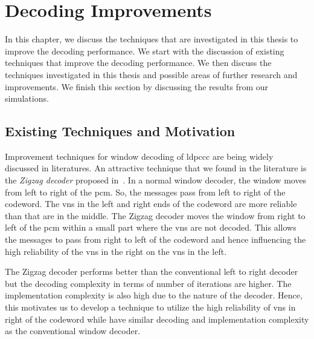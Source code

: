 \chapter{Decoding Improvements}\label{ch:dec_improve}
In this chapter, we discuss the techniques that are investigated in this thesis to improve the decoding performance. We start with the discussion of existing techniques that improve the decoding performance. We then discuss the techniques investigated in this thesis and possible areas of further research and improvements. We finish this section by discussing the results from our simulations.

\section{Existing Techniques and Motivation}
Improvement techniques for window decoding of \gls{ldpccc} are being widely discussed in literatures. An attractive technique that we found in the literature is the \emph{Zigzag decoder} proposed in~\cite{Shadi2015}. In a normal window decoder, the window moves from left to right of the \gls{pcm}. So, the messages pass from left to right of the codeword. The \glspl{vn} in the left and right ends of the codeword are more reliable than that are in the middle. The Zigzag decoder moves the window from right to left of the \gls{pcm} within a small part where the \glspl{vn} are not decoded. This allows the messages to pass from right to left of the codeword and hence influencing the high reliability of the \glspl{vn} in the right on the \glspl{vn} in the left.

The Zigzag decoder performs better than the conventional left to right decoder but the decoding complexity in terms of number of iterations are higher. The implementation complexity is also high due to the nature of the decoder. Hence, this motivates us to develop a technique to utilize the high reliability of \glspl{vn} in right of the codeword while have similar decoding and implementation complexity as the conventional window decoder.

